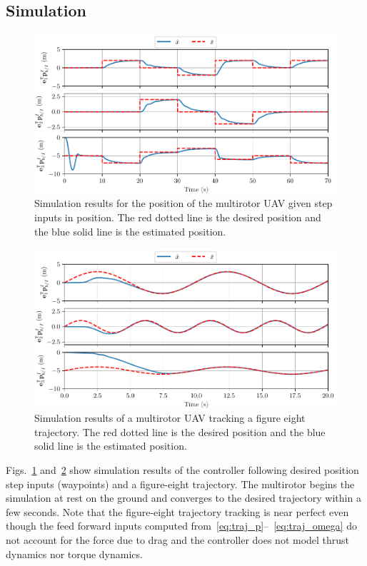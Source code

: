 
\subsection{Simulation}

\begin{figure}
  \centering
  \includegraphics[width=6.5in]{figures/sim_wps_position}
  \caption[LQR Simulation Results Flying Waypoints]{Simulation results for the position of the multirotor UAV given step
  inputs in position. The red dotted line is the desired position and the blue
solid line is the estimated position.}
  \label{f:sim_wps}
\end{figure}

\begin{figure}
  \centering
  \includegraphics[width=6.5in]{figures/sim_fig8_position}
  \caption[LQR Simulation Results Flying a Trajectory]{Simulation results of a multirotor UAV tracking a figure eight
  trajectory. The red dotted line is the desired position and the blue solid
line is the estimated position.}
  \label{f:sim_fig8}
\end{figure}

Figs.~\ref{f:sim_wps} and~\ref{f:sim_fig8} show simulation results of the
controller following desired position step inputs (waypoints) and a figure-eight trajectory. The
multirotor begins the simulation at rest on the ground and converges to the
desired trajectory within a few seconds. Note that the figure-eight trajectory
tracking is near perfect even though the feed forward inputs computed
from~\eqref{eq:traj_p}{}--{}~\eqref{eq:traj_omega} do not account for the force due to drag and
the controller does not model thrust dynamics nor torque dynamics.
